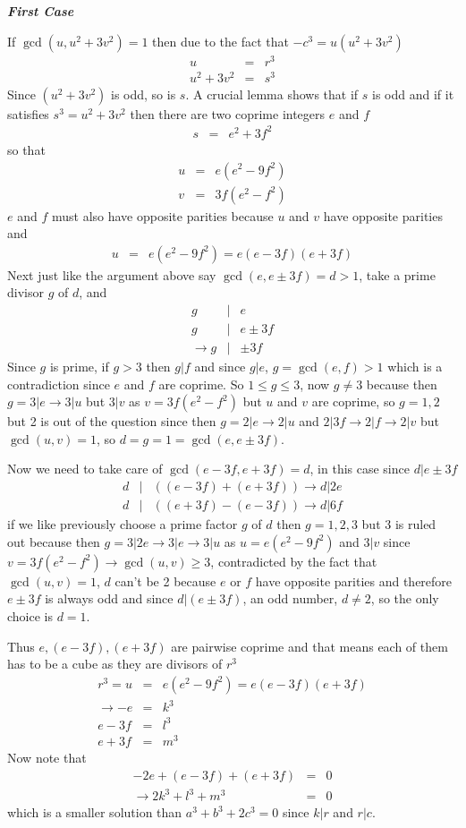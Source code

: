\documentclass[aps,preprint,preprintnumbers,nofootinbib,showpacs,prd]{revtex4-1}
\newcommand{\nbea}{\begin{eqnarray*}}
\newcommand{\neea}{\end{eqnarray*}}
\begin{document}
\bigskip
\textit{\textbf{First Case}}
\smallskip

If $\gcd(u, u^2 + 3v^2) = 1$ then due to the fact that $-c^3 = u (u^2 + 3v^2)$
%
\nbea
u &= & r^3 \\
u^2 + 3v^2 & = & s^3
\neea
%
Since $(u^2 + 3v^2)$ is odd, so is $s$. A crucial lemma shows that if $s$ is odd and if it satisfies $s^3 = u^2 + 3v^2$ then there are two coprime integers $e$ and $f$
%
\nbea
s & = & e^2 + 3f^2
\neea
%
so that
%
\nbea
u & = & e (e^2 - 9 f^2) \\
v & = & 3f (e^2 - f^2)
\neea
%
$e$ and $f$ must also have opposite parities because $u$ and $v$ have opposite parities and
%
\nbea
u & = & e (e^2 - 9 f^2) = e (e - 3f) (e + 3f)
\neea
%
Next just like the argument above say $\gcd(e,e \pm 3f) = d > 1$, take a prime divisor $g$ of $d$, and
%
\nbea
g &|& e \\
g &|& e \pm 3f \\
\to g &|& \pm 3f
\neea
%
Since $g$ is prime, if $g > 3$ then $g|f$ and since $g|e$, $g = \gcd(e,f) > 1$ which is a contradiction since $e$ and $f$ are coprime. So $1 \le g \le 3$, now $g \neq 3$ because then $g=3 | e \to 3 | u$ but $3 | v$ as $v = 3f (e^2 - f^2)$ but $u$ and $v$ are coprime, so $g = 1,2$ but 2 is out of the question since then $g = 2 | e \to 2 | u$ and $2 | 3f \to 2 | f \to 2 |v$ but $\gcd(u,v) = 1$, so $d = g = 1 = \gcd(e, e \pm 3f)$.

Now we need to take care of $\gcd(e-3f, e+3f) = d$, in this case since $d | e \pm 3f$
%
\nbea
d &|& ((e-3f)+(e+3f)) \to d | 2e \\
d &|& ((e+3f)-(e-3f)) \to d | 6f
\neea
%
if we like previously choose a prime factor $g$ of $d$ then $g = 1,2,3$ but 3 is ruled out because then $g=3 | 2e \to 3 | e \to 3|u$ as $u = e (e^2 - 9 f^2)$ and $3|v$ since $v = 3f (e^2 - f^2) \to \gcd(u,v) \ge 3$, contradicted by the fact that $\gcd(u,v) = 1$, $d$ can't be 2 because $e$ or $f$ have opposite parities and therefore $e \pm 3f$ is always odd and since $d | (e \pm 3f)$, an odd number, $d \neq 2$, so the only choice is $d = 1$.

Thus $e, (e - 3f), (e + 3f)$ are pairwise coprime and that means each of them has to be a cube as they are divisors of $r^3$
%
\nbea
r^3 = u & = & e (e^2 - 9 f^2) = e (e - 3f) (e + 3f) \\
\to -e & = & k^3 \\
e - 3f & = & l^3 \\
e + 3f & = & m^3
\neea
%
Now note that
%
\nbea
-2e + (e - 3f) + (e + 3f) & = & 0 \\
\to 2k^3 + l^3 + m^3 & = & 0
\neea
%
which is a smaller solution than $a^3 + b^3 + 2c^3 = 0$ since $k | r$ and $r|c$.
\end{document}
